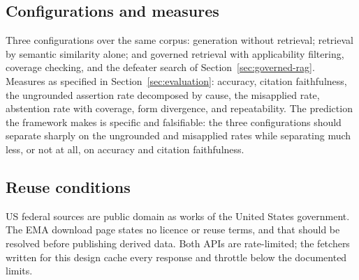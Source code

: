 \subsection{Configurations and measures}

Three configurations over the same corpus: generation without retrieval; retrieval by
semantic similarity alone; and governed retrieval with applicability filtering, coverage
checking, and the defeater search of Section~\ref{sec:governed-rag}. Measures as
specified in Section~\ref{sec:evaluation}: accuracy, citation faithfulness, the
ungrounded assertion rate decomposed by cause, the misapplied rate, abstention rate with
coverage, form divergence, and repeatability. The prediction the framework makes is
specific and falsifiable: the three configurations should separate sharply on the
ungrounded and misapplied rates while separating much less, or not at all, on accuracy
and citation faithfulness.

\subsection{Reuse conditions}

US federal sources are public domain as works of the United States government. The EMA
download page states no licence or reuse terms, and that should be resolved before
publishing derived data. Both APIs are rate-limited; the fetchers written for this design
cache every response and throttle below the documented limits.
